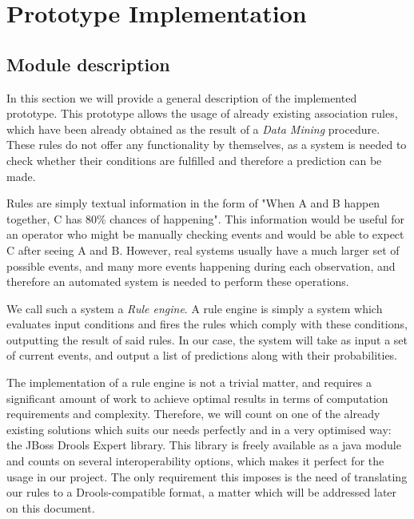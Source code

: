 \chapter{Prototype Implementation}
\label{chap:prototype}

\section{Module description}
\label{sec:module_description}
In this section we will provide a general description of the implemented prototype. This prototype allows the usage of already existing association rules, which have been already obtained as the result of a \emph{Data Mining}\cite{torgo2003data}\cite{han2006data} procedure. These rules do not offer any functionality by themselves, as a system is needed to check whether their conditions are fulfilled and therefore a prediction can be made.

Rules are simply textual information in the form of "When A and B happen together, C has 80\% chances of happening". This information would be useful for an operator who might be manually checking events and would be able to expect C after seeing A and B. However, real systems usually have a much larger set of possible events, and many more events happening during each observation, and therefore an automated system is needed to perform these operations.

We call such a system a \emph{Rule engine}\cite{liang2009openrulebench}. A rule engine is simply a system which evaluates input conditions and fires the rules which comply with these conditions, outputting the result of said rules. In our case, the system will take as input a set of current events, and output a list of predictions along with their probabilities.

The implementation of a rule engine is not a trivial matter, and requires a significant amount of work to achieve optimal results in terms of computation requirements and complexity. Therefore, we will count on one of the already existing solutions which suits our needs perfectly and in a very optimised way: the JBoss Drools Expert library\cite{browne2009jboss}. This library is freely available as a java module and counts on several interoperability options, which makes it perfect for the usage in our project. The only requirement this imposes is the need of translating our rules to a Drools-compatible format, a matter which will be addressed later on this document.

